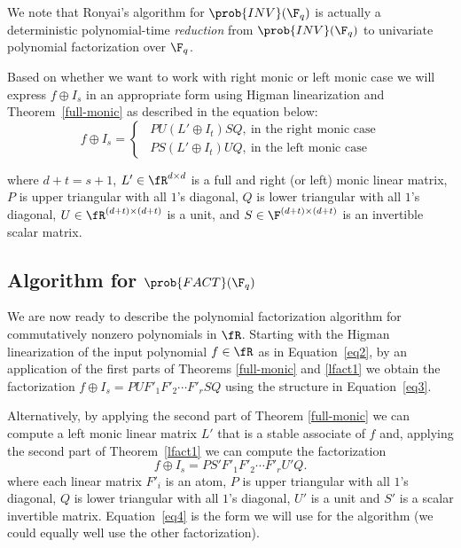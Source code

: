 \begin{remark}
We note that Ronyai's algorithm \cite{Ronyai2} for $\prob{INV}(\F_q)$
is actually a deterministic polynomial-time \emph{reduction} from
$\prob{INV}(\F_q)$ to univariate polynomial factorization over $\F_q$.
\end{remark}  

 
%
%
%

Based on whether we want to work with right monic or left
monic case we will express $f \oplus I_s$ in an appropriate form using
Higman linearization and Theorem~\ref{full-monic} as described in the
equation below:
\begin{equation}\label{eq2}
f\oplus I_s = 
\begin{cases}
~~PU(L'\oplus I_t) SQ,~ \text{in the right monic case}\\ 
~~PS(L'\oplus I_{t}) UQ,~ \text{in the left monic case} 
\end{cases}
\end{equation}


where $d+t=s+1$, $L'\in\fR^{d\times d}$ is a full and right (or left) monic linear
matrix, $P$ is upper triangular with all $1$'s diagonal, $Q$ is lower
triangular with all $1$'s diagonal, $U\in\fR^{(d+t)\times (d+t)}$ is a
unit, and $S\in\F^{(d+t)\times (d+t)}$ is an invertible scalar
matrix. 


\subsection*{Algorithm for $\prob{FACT}(\F_q)$}

We are now ready to describe the polynomial factorization algorithm
for commutatively nonzero polynomials in $\fR$. Starting with the
Higman linearization of the input polynomial $f\in\fR$ as in
Equation~\ref{eq2}, by an application of the first parts of Theorems
\ref{full-monic} and \ref{lfact1} we obtain the factorization
$f\oplus I_s = PUF'_1F'_2\cdots F'_r SQ$ using the structure in
Equation~\ref{eq3}. 

Alternatively, by applying the second part of Theorem \ref{full-monic}
we can compute a left monic linear matrix $L'$ that is a stable
associate of $f$ and, applying the second part of Theorem~\ref{lfact1}
we can compute the factorization
\begin{equation}\label{eq4}
f\oplus I_s = PS'F'_1F'_2\cdots F'_r U'Q.
\end{equation}
where each linear matrix $F'_i$ is an atom, $P$ is upper triangular
with all $1$'s diagonal, $Q$ is lower triangular with all $1$'s
diagonal, $U'$ is a unit and $S'$ is a scalar invertible matrix.
Equation~\ref{eq4} is the form we will use for the algorithm (we could
equally well use the other factorization).

